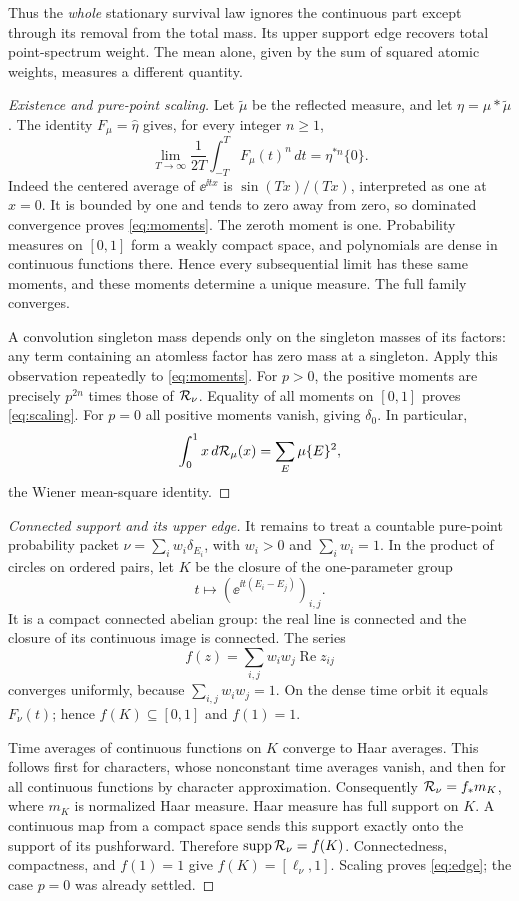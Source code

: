 Thus the \emph{whole} stationary survival law ignores the continuous
part except through its removal from the total mass. Its upper
support edge recovers total point-spectrum weight. The mean alone,
given by the sum of squared atomic weights, measures a different
quantity.

\begin{proof}[Existence and pure-point scaling]
Let $\widetilde\mu$ be the reflected measure, and let
$\eta=\mu*\widetilde\mu$. The identity
$F_\mu=\widehat\eta$ gives, for every integer $n\geq1$,
\begin{equation}
 \lim_{T\to\infty}\frac1{2T}\int_{-T}^T F_\mu(t)^n\,dt
       =\eta^{*n}\{0\}.
 \label{eq:moments}
\end{equation}
Indeed the centered average of $\ee^{\ii tx}$ is
$\sin(Tx)/(Tx)$, interpreted as one at $x=0$. It is bounded by one
and tends to zero away from zero, so dominated convergence proves
\eqref{eq:moments}. The zeroth moment is one.
Probability measures on $[0,1]$ form a weakly compact space, and
polynomials are dense in continuous functions there. Hence every
subsequential limit has these same moments, and these moments
determine a unique measure. The full family converges.

A convolution singleton mass depends only on the singleton masses
of its factors: any term containing an atomless factor has zero
mass at a singleton. Apply this observation repeatedly to
\eqref{eq:moments}. For $p>0$, the positive moments are precisely
$p^{2n}$ times those of $\mathcal R_\nu$. Equality of all moments on
$[0,1]$ proves \eqref{eq:scaling}. For $p=0$ all positive moments
vanish, giving $\delta_0$. In particular,
\[
 \int_0^1 x\,d\mathcal R_\mu(x)=\sum_E\mu\{E\}^2,
\]
the Wiener mean-square identity.
\end{proof}

\begin{proof}[Connected support and its upper edge]
It remains to treat a countable pure-point probability packet
$\nu=\sum_i w_i\delta_{E_i}$, with $w_i>0$ and $\sum_iw_i=1$.
In the product of circles on ordered pairs, let $K$ be the closure
of the one-parameter group
\[
 t\longmapsto(\ee^{\ii t(E_i-E_j)})_{i,j}.
\]
It is a compact connected abelian group: the real line is connected
and the closure of its continuous image is connected.
The series
\[
 f(z)=\sum_{i,j}w_iw_j\operatorname{Re}z_{ij}
\]
converges uniformly, because $\sum_{i,j}w_iw_j=1$.
On the dense time orbit it equals $F_\nu(t)$; hence
$f(K)\subseteq[0,1]$ and $f(1)=1$.

Time averages of continuous functions on $K$ converge to Haar
averages. This follows first for characters, whose nonconstant
time averages vanish, and then for all continuous functions by
character approximation. Consequently
$\mathcal R_\nu=f_*m_K$, where $m_K$ is normalized Haar measure.
Haar measure has full support on $K$. A continuous map from a
compact space sends this support exactly onto the support of its
pushforward. Therefore
$\operatorname{supp}\mathcal R_\nu=f(K)$. Connectedness, compactness, and $f(1)=1$
give $f(K)=[\ell_\nu,1]$. Scaling proves
\eqref{eq:edge}; the case $p=0$ was already settled.
\end{proof}

